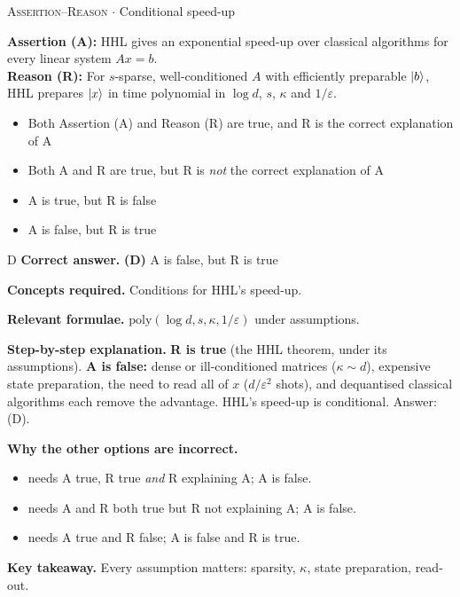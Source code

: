 \documentclass[11pt,a4paper]{article}
\newcommand{\optlabel}[1]{\textbf{(#1)}}
\newcommand{\correctlabel}[1]{\textcolor{okgreen}{\textbf{(#1)}\,\ding{51}}}
\newenvironment{qitem}[1]{\begin{list}{}{\setlength{\leftmargin}{3.3em}\setlength{\labelwidth}{3.1em}%
  \setlength{\labelsep}{0.2em}\setlength{\topsep}{3pt}\setlength{\parsep}{3pt}}\item[\textbf{Q.#1}\hfill]}{\end{list}}
\newcommand{\qsep}{\par\vspace{2pt}{\color{black!15}\hrule}\vspace{4pt}}
\newcommand{\qmeta}[2]{{\footnotesize\color{black!60}\textsc{#1} \;$\cdot$\; #2}\par}
\begin{document}
\begin{qitem}{69}
\qmeta{Assertion--Reason}{Conditional speed-up}
\textbf{Assertion (A):} HHL gives an exponential speed-up over classical algorithms for every linear system $Ax = b$.\\[1mm]
\textbf{Reason (R):} For $s$-sparse, well-conditioned $A$ with efficiently preparable $\ket b$, HHL prepares $\ket x$ in time polynomial in $\log d$, $s$, $\kappa$ and $1/\varepsilon$.
\begin{itemize}[leftmargin=2.6em, labelsep=0.4em, itemsep=2pt, topsep=3pt]
\item[\optlabel{A}] Both Assertion (A) and Reason (R) are true, and R is the correct explanation of A
\item[\optlabel{B}] Both A and R are true, but R is \emph{not} the correct explanation of A
\item[\optlabel{C}] A is true, but R is false
\item[\correctlabel{D}] A is false, but R is true
\end{itemize}
\end{qitem}
\begin{solbox}{D}
\textbf{\color{brand}Correct answer.} \textcolor{okgreen}{\textbf{(D)}} A is false, but R is true

\textbf{\color{brand}Concepts required.} Conditions for HHL's speed-up.

\textbf{\color{brand}Relevant formulae.} $\mathrm{poly}(\log d, s, \kappa, 1/\varepsilon)$ under assumptions.

\textbf{\color{brand}Step-by-step explanation.} \textbf{R is true} (the HHL theorem, under its assumptions).
\textbf{A is false:} dense or ill-conditioned matrices ($\kappa \sim d$), expensive state preparation, the need to read all of $x$ ($d/\varepsilon^2$ shots), and dequantised classical algorithms
each remove the advantage. HHL's speed-up is conditional. Answer: (D).

\textbf{\color{brand}Why the other options are incorrect.}
\begin{itemize}[leftmargin=2.4em, itemsep=1pt, topsep=2pt]
\item[\textbf{(A)}] needs A true, R true \emph{and} R explaining A; A is false.
\item[\textbf{(B)}] needs A and R both true but R not explaining A; A is false.
\item[\textbf{(C)}] needs A true and R false; A is false and R is true.
\end{itemize}
\textbf{\color{brand}Key takeaway.} Every assumption matters: sparsity, $\kappa$, state preparation, read-out.
\end{solbox}
\qsep
\end{document}
